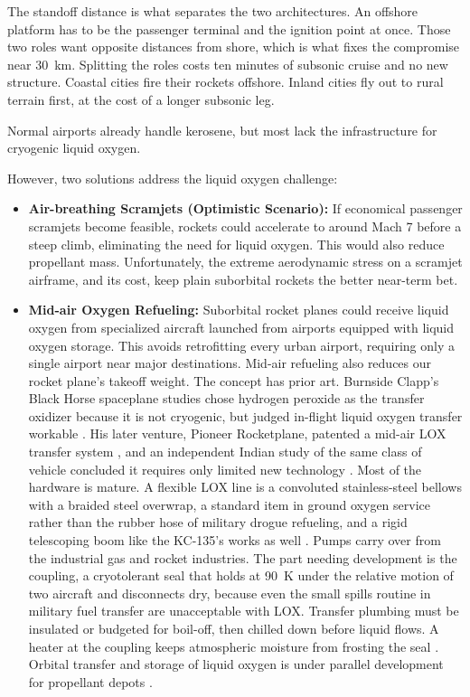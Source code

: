 \documentclass{article}
\begin{document}
The standoff distance is what separates the two architectures. An offshore platform has to be the passenger terminal and the ignition point at once. Those two roles want opposite distances from shore, which is what fixes the compromise near \SI{30}{\kilo\meter}. Splitting the roles costs ten minutes of subsonic cruise and no new structure. Coastal cities fire their rockets offshore. Inland cities fly out to rural terrain first, at the cost of a longer subsonic leg.

Normal airports already handle kerosene, but most lack the infrastructure for cryogenic liquid oxygen.

However, two solutions address the liquid oxygen challenge:
\begin{itemize}
\item \textbf{Air-breathing Scramjets (Optimistic Scenario):} If economical passenger scramjets become feasible, rockets could accelerate to around Mach 7 \cite{nasa_x43a} before a steep climb, eliminating the need for liquid oxygen. This would also reduce propellant mass. Unfortunately, the extreme aerodynamic stress on a scramjet airframe, and its cost, keep plain suborbital rockets the better near-term bet.
\item \textbf{Mid-air Oxygen Refueling:} Suborbital rocket planes could receive liquid oxygen from specialized aircraft launched from airports equipped with liquid oxygen storage. This avoids retrofitting every urban airport, requiring only a single airport near major destinations.   Mid-air refueling also reduces our rocket plane's takeoff weight.  The concept has prior art. Burnside Clapp's Black Horse spaceplane studies chose hydrogen peroxide as the transfer oxidizer because it is not cryogenic, but judged in-flight liquid oxygen transfer workable \cite{clapp1995_propellant_transfer}. His later venture, Pioneer Rocketplane, patented a mid-air LOX transfer system \cite{clapp2000_lox_patent}, and an independent Indian study of the same class of vehicle concluded it requires only limited new technology \cite{jayan2004aptsp}. Most of the hardware is mature. A flexible LOX line is a convoluted stainless-steel bellows with a braided steel overwrap, a standard item in ground oxygen service rather than the rubber hose of military drogue refueling, and a rigid telescoping boom like the KC-135's works as well \cite{clapp2000_lox_patent}. Pumps carry over from the industrial gas and rocket industries. The part needing development is the coupling, a cryotolerant seal that holds at \SI{90}{\kelvin} under the relative motion of two aircraft and disconnects dry, because even the small spills routine in military fuel transfer are unacceptable with LOX. Transfer plumbing must be insulated or budgeted for boil-off, then chilled down before liquid flows. A heater at the coupling keeps atmospheric moisture from frosting the seal \cite{clapp2000_lox_patent}. Orbital transfer and storage of liquid oxygen is under parallel development for propellant depots \cite{nasa_loxsat_cfm}.
\end{itemize}
\end{document}
